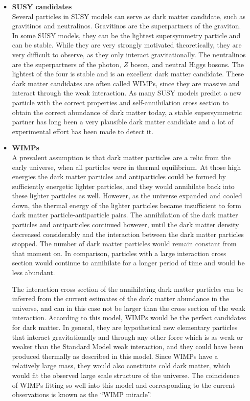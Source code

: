 \begin{itemize}
 \item[] \textbf{\acs{SUSY} candidates}\\
         Several particles in \ac{SUSY} models can serve as dark matter candidate, such as gravitinos and neutralinos. Gravitinos are the superpartners of the graviton. In some \ac{SUSY} models, they can be the lightest supersymmetry particle and can be stable. While they are very strongly motivated theoretically, they are very difficult to observe, as they only interact gravitationally. The neutralinos are the superpartners of the photon, $Z$ boson, and neutral Higgs bosons. The lightest of the four is stable and is an excellent dark matter candidate. These dark matter candidates are often called \acp{WIMP}, since they are massive and interact through the weak interaction. As many \ac{SUSY} models predict a new particle with the correct properties and self-annihilation cross section to obtain the correct abundance of dark matter today, a stable supersymmetric partner has long been a very plausible dark matter candidate and a lot of experimental effort has been made to detect it.
         
 \item[] \textbf{\acp{WIMP}}\\         
         A prevalent assumption is that dark matter particles are a relic from the early universe, when all particles were in thermal equilibrium. At those high energies the dark matter particles and antiparticles could be formed by sufficiently energetic lighter particles, and they would annihilate back into these lighter particles as well. However, as the universe expanded and cooled down, the thermal energy of the lighter particles became insufficient to form dark matter particle-antiparticle pairs. The annihilation of the dark matter particles and antiparticles continued however, until the dark matter density decreased considerably and the interaction between the dark matter particles stopped. The number of dark matter particles would remain constant from that moment on. In comparison, particles with a large interaction cross section would continue to annihilate for a longer period of time and would be less abundant. 
         
         The interaction cross section of the annihilating dark matter particles can be inferred from the current estimates of the dark matter abundance in the universe, and can in this case not be larger than the cross section of the weak interaction. According to this model, \acp{WIMP} would be the perfect candidates for dark matter. In general, they are hypothetical new elementary particles that interact gravitationally and through any other force which is as weak or weaker than the Standard Model weak interaction, and they could have been produced thermally as described in this model. Since \acp{WIMP} have a relatively large mass, they would also constitute cold dark matter, which would fit the observed large scale structure of the universe. The coincidence of \acp{WIMP} fitting so well into this model and corresponding to the current observations is known as the ``\ac{WIMP} miracle''.
         

\end{itemize}
